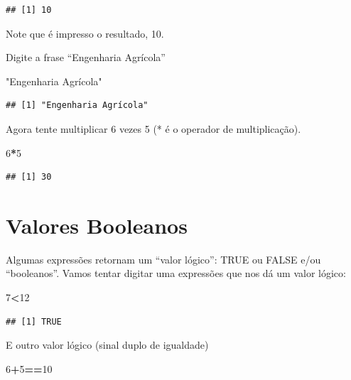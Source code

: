 \documentclass[
]{book}
\newenvironment{Shaded}{\begin{snugshade}}{\end{snugshade}}
\newcommand{\DecValTok}[1]{\textcolor[rgb]{0.00,0.00,0.81}{#1}}
\newcommand{\OperatorTok}[1]{\textcolor[rgb]{0.81,0.36,0.00}{\textbf{#1}}}
\newcommand{\StringTok}[1]{\textcolor[rgb]{0.31,0.60,0.02}{#1}}
\begin{document}
\begin{verbatim}
## [1] 10
\end{verbatim}

Note que é impresso o resultado, 10.

Digite a frase ``Engenharia Agrícola''

\begin{Shaded}
\begin{Highlighting}[]
\StringTok{"Engenharia Agrícola"}
\end{Highlighting}
\end{Shaded}

\begin{verbatim}
## [1] "Engenharia Agrícola"
\end{verbatim}

Agora tente multiplicar 6 vezes 5 (* é o operador de multiplicação).

\begin{Shaded}
\begin{Highlighting}[]
\DecValTok{6}\OperatorTok{*}\DecValTok{5}
\end{Highlighting}
\end{Shaded}

\begin{verbatim}
## [1] 30
\end{verbatim}

\hypertarget{valores-booleanos}{%
\section{Valores Booleanos}\label{valores-booleanos}}

Algumas expressões retornam um ``valor lógico'': TRUE ou FALSE e/ou ``booleanos''.
Vamos tentar digitar uma expressões que nos dá um valor lógico:

\begin{Shaded}
\begin{Highlighting}[]
\DecValTok{7}\OperatorTok{<}\DecValTok{12}
\end{Highlighting}
\end{Shaded}

\begin{verbatim}
## [1] TRUE
\end{verbatim}

E outro valor lógico (sinal duplo de igualdade)

\begin{Shaded}
\begin{Highlighting}[]
\DecValTok{6}\OperatorTok{+}\DecValTok{5}\OperatorTok{==}\DecValTok{10}
\end{Highlighting}
\end{Shaded}
\end{document}
